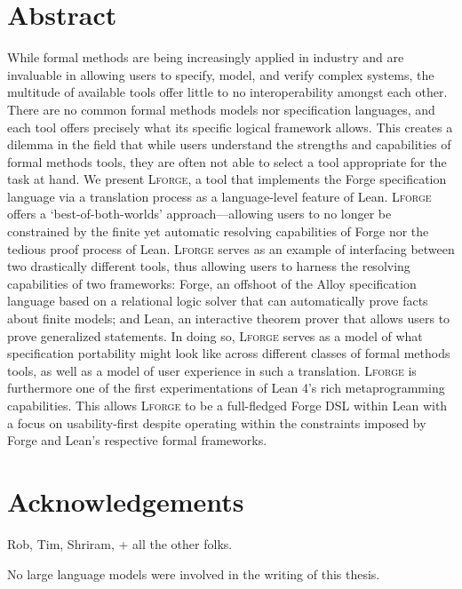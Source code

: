 \newpage
\section*{Abstract}
While formal methods are being increasingly applied in industry and are invaluable in allowing users to specify, model, and verify complex systems, the multitude of available tools offer little to no interoperability amongst each other. 
There are no common formal methods models nor specification languages, and each tool offers precisely what its specific logical framework allows. 
This creates a dilemma in the field that while users understand the strengths and capabilities of formal methods tools, they are often not able to select a tool appropriate for the task at hand. 
We present \textsc{Lforge}, a tool that implements the Forge specification language via a translation process as a language-level feature of Lean. 
\textsc{Lforge} offers a `best-of-both-worlds' approach---allowing users to no longer be constrained by the finite yet automatic resolving capabilities of Forge nor the tedious proof process of Lean.
\textsc{Lforge} serves as an example of interfacing between two drastically different tools, thus allowing users to harness the resolving capabilities of two frameworks: Forge, an offshoot of the Alloy specification language based on a relational logic solver that can automatically prove facts about finite models; and Lean, an interactive theorem prover that allows users to prove generalized statements. 
In doing so, \textsc{Lforge} serves as a model of what specification portability might look like across different classes of formal methods tools, as well as a model of user experience in such a translation. 
\textsc{Lforge} is furthermore one of the first experimentations of Lean 4's rich metaprogramming capabilities. This allows \textsc{Lforge} to be a full-fledged Forge DSL within Lean with a focus on usability-first despite operating within the constraints imposed by Forge and Lean's respective formal frameworks. 

\newpage
\section*{Acknowledgements}
{\color{OliveGreen}
Rob, Tim, Shriram, + all the other folks.}


No large language models were involved in the writing of this thesis.

